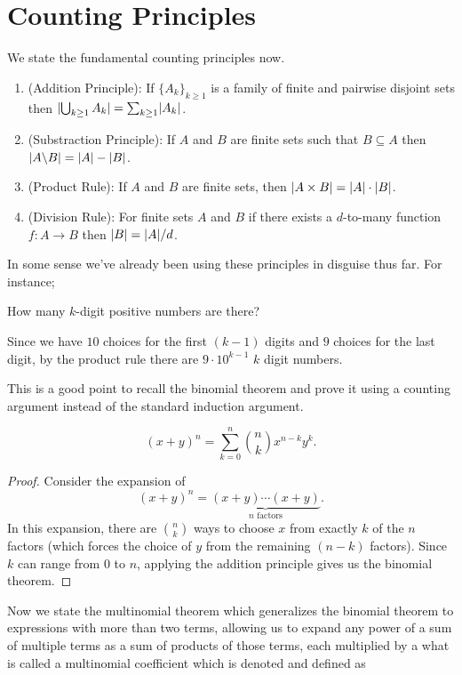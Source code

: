 \section{Counting Principles}
We state the fundamental counting principles now.
\begin{enumerate}
\item (Addition Principle): If $\{A_{k}\}_{k\geq 1}$ is a family of finite and pairwise disjoint sets then $\lvert\bigcup_{k\geq 1} A_{k}\rvert = \sum_{k\geq 1}\lvert A_{k}\rvert$.
\item (Substraction Principle): If $A$ and $B$ are finite sets such that $B\subseteq A$ then $\lvert A\backslash B\rvert = \lvert A\rvert-\lvert B\rvert$.
\item (Product Rule): If $A$ and $B$ are finite sets, then $\lvert A\times B\rvert = \lvert A\rvert\cdot\lvert B\rvert$.
\item (Division Rule): For finite sets $A$ and $B$ if there exists a $d$-to-many function $f:A\to B$ then $\lvert B\rvert=\lvert A\rvert/d$.
\end{enumerate}
In some sense we've already been using these principles in disguise thus far. For instance;
\begin{question}
How many $k$-digit positive numbers are there?
\end{question}
\begin{solution}
Since we have $10$ choices for the first $\left(k-1\right)$ digits and $9$ choices for the last digit, by the product rule there are $9\cdot 10^{k-1}$ $k$ digit numbers.
\end{solution}
This is a good point to recall the binomial theorem and prove it using a counting argument instead of the standard induction argument.
\begin{theorem}
	\[
		\left( x+y \right)^n = \sum_{k=0}^{n}\binom{n}{k}x^{n-k}y^k
	.\] 
\end{theorem}
\begin{proof}
	Consider the expansion of
	\[
		\left( x+y \right)^n = \underbrace{\left( x+y \right) \cdots \left( x+y \right) }_{n \text{ factors}}.
	\]
	In this expansion, there are $\binom{n}{k}$ ways to choose $x$ from exactly $k$ of the $n$ factors (which forces the choice of $y$ from the remaining $(n-k)$ factors). Since $k$ can range from $0$ to $n$, applying the addition principle gives us the binomial theorem.
\end{proof}
Now we state the multinomial theorem which generalizes the binomial theorem to expressions with more than two terms, allowing us to expand any power of a sum of multiple terms as a sum of products of those terms, each multiplied by a what is called a multinomial coefficient which is denoted and defined as
